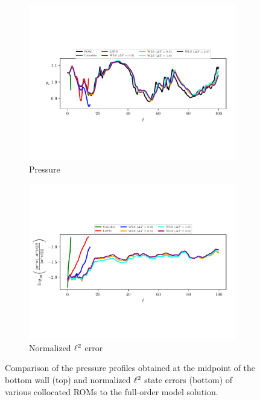 \begin{figure}
\begin{center}

\begin{subfigure}[t]{0.95\textwidth}
\includegraphics[trim={0cm 3.0cm 0cm 3cm},clip,width=1.\linewidth]{figs/cavity/pressure_basis2.pdf}
\caption{Pressure} 
\label{fig:cav_results1a}
\end{subfigure}

\begin{subfigure}[t]{0.95\textwidth}
\includegraphics[trim={0cm 2.8cm 0cm 3cm},clip,width=1.\linewidth]{figs/cavity/error_basis2.pdf}
\caption{Normalized $\ell^2$ error}
\label{fig:cav_results1b}
\end{subfigure}

\end{center}
\caption{Comparison of the pressure profiles obtained at the midpoint of the bottom wall (top) and normalized $\ell^2$ state errors (bottom) of various collocated ROMs to the full-order model solution.}
\label{fig:cav_results1}
\end{figure}

